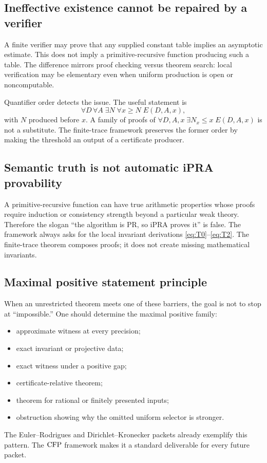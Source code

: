 \subsection{Ineffective existence cannot be repaired by a verifier}

A finite verifier may prove that any supplied constant table implies an
asymptotic estimate.  This does not imply a primitive-recursive function
producing such a table.  The difference mirrors proof checking versus theorem
search: local verification may be elementary even when uniform production is
open or noncomputable.

Quantifier order detects the issue.  The useful statement is
\[
 \forall D\,\forall A\;\exists N\;\forall x\ge N\;E(D,A,x),
\]
with \(N\) produced before \(x\).  A family of proofs of
\(\forall D,A,x\;\exists N_x\le x\;E(D,A,x)\) is not a substitute.  The
finite-trace framework preserves the former order by making the threshold an
output of a certificate producer.

\subsection{Semantic truth is not automatic iPRA provability}

A primitive-recursive function can have true arithmetic properties whose
proofs require induction or consistency strength beyond a particular weak
theory.  Therefore the slogan ``the algorithm is PR, so iPRA proves it'' is
false.  The framework always asks for the local invariant derivations
\eqref{eq:T0}--\eqref{eq:T2}.  The finite-trace theorem composes proofs; it
does not create missing mathematical invariants.

\subsection{Maximal positive statement principle}

When an unrestricted theorem meets one of these barriers, the goal is not to
stop at ``impossible.''  One should determine the maximal positive family:
\begin{itemize}
\item approximate witness at every precision;
\item exact invariant or projective data;
\item exact witness under a positive gap;
\item certificate-relative theorem;
\item theorem for rational or finitely presented inputs;
\item obstruction showing why the omitted uniform selector is stronger.
\end{itemize}
The Euler--Rodrigues and Dirichlet--Kronecker packets already exemplify this
pattern.  The \(\mathrm{CFP}\) framework makes it a standard deliverable for every
future packet.
